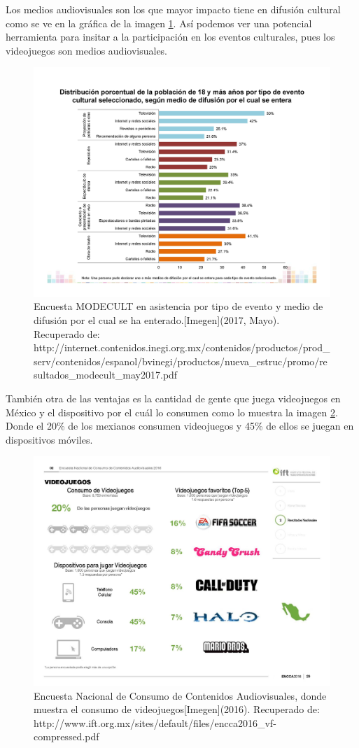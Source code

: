 Los medios audiovisuales son los que mayor impacto tiene en difusión cultural como se ve en la gráfica de la imagen \ref{fig:modecult}. Así podemos ver una potencial herramienta para insitar a la participación en los eventos culturales, pues los videojuegos son medios audiovisuales.
\\[1pt]

\begin{figure}
	\centering 
	\includegraphics[width=.75\textwidth]{03MarcoTeorico/imageR/modecult.jpg}
	\caption{Encuesta MODECULT en asistencia por tipo de evento y medio de difusión por el cual se ha enterado.[Imegen](2017, Mayo). Recuperado de: http://internet.contenidos.inegi.org.mx/contenidos/productos/prod\_serv/contenidos/espanol/bvinegi/productos/nueva\_estruc/promo/resultados\_modecult\_may2017.pdf}
	\label{fig:modecult}
\end{figure}

También otra de las ventajas es la cantidad de gente que juega videojuegos en México y el dispositivo por el cuál lo consumen como lo muestra la imagen \ref{fig:consumo30}. Donde el 20\% de los mexianos consumen videojuegos y 45\% de ellos se juegan en dispositivos móviles.

\begin{figure}
	\centering 
	\includegraphics[width=.75\textwidth]{03MarcoTeorico/imageR/consumo30}
	\caption{Encuesta Nacional de Consumo de Contenidos Audiovisuales, donde muestra el consumo de videojuegos[Imegen](2016). Recuperado de: http://www.ift.org.mx/sites/default/files/encca2016\_vf-compressed.pdf}
	\label{fig:consumo30}
\end{figure}

